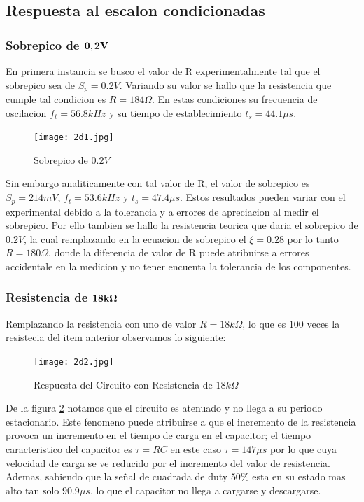 \subsection{Respuesta al escalon condicionadas}

\subsubsection{Sobrepico de $\bold{0,2V}$} \label{dSobrepico de 0.2v}

En primera instancia se busco el valor de R experimentalmente tal que el sobrepico sea de $S_p=0.2V$. Variando su valor se hallo que la resistencia que cumple tal condicion es $R=184\Omega$. En estas condiciones su frecuencia de oscilacion $f_t=56.8kHz$ y su tiempo de establecimiento $t_s = 44.1{\mu}s$. 

\begin{figure}[h!]
\centering
\texttt{[image: 2d1.jpg]}
\caption{Sobrepico de $0.2V$}
\label{fig:LRC2d1}
\end{figure}

Sin embargo analiticamente con tal valor de R, el valor de sobrepico es $S_p = 214mV$, $f_t= 53.6kHz$ y $t_s = 47.4{\mu}s$. Estos resultados pueden variar con el experimental debido a la tolerancia y a errores de apreciacion al medir el sobrepico. Por ello tambien se hallo la resistencia teorica que daria el sobrepico de $0.2V$, la cual remplazando en la ecuacion de sobrepico el $\xi=0.28$ por lo tanto $R=180\Omega$, donde la diferencia de valor de R puede atribuirse a errores accidentale en la medicion y no tener encuenta la tolerancia de los componentes. 

\subsubsection{Resistencia de $\bold{18k\Omega}$}

Remplazando la resistencia con uno de valor $R=18k\Omega$, lo que es $100$ veces la resistecia del item anterior observamos lo siguiente:

\begin{figure}[h!]
\centering
\texttt{[image: 2d2.jpg]}
\caption{Respuesta del Circuito con Resistencia de $18k\Omega$} 	
\label{fig:LRC2d2}
\end{figure}

De la figura \ref{fig:LRC2d2} notamos que el circuito es atenuado y no llega a su periodo estacionario. Este fenomeno puede atribuirse a que el incremento de la resistencia provoca un incremento en el tiempo de carga en el capacitor; el tiempo caracteristico del capacitor es $\tau = RC$ en este caso $\tau = 147{\mu}s$ por lo que cuya velocidad de carga se ve reducido por el incremento del valor de resistencia. Ademas, sabiendo que la señal de cuadrada de duty $50\%$ esta en su estado mas alto tan solo $90.9{\mu}s$, lo que el capacitor no llega a cargarse y descargarse. 

